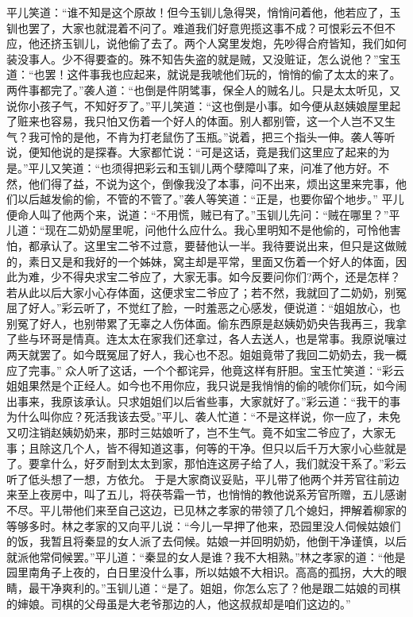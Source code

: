 \documentclass[12pt,oneside]{book}
\begin{document}
平儿笑道：“谁不知是这个原故！但今玉钏儿急得哭，悄悄问着他，他若应了，玉钏也罢了，大家也就混着不问了。难道我们好意兜揽这事不成？可恨彩云不但不应，他还挤玉钏儿，说他偷了去了。两个人窝里发炮，先吵得合府皆知，我们如何装没事人。少不得要查的。殊不知告失盗的就是贼，又没赃证，怎么说他？”宝玉道：“也罢！这件事我也应起来，就说是我唬他们玩的，悄悄的偷了太太的来了。两件事都完了。”袭人道：“也倒是件阴骘事，保全人的贼名儿。只是太太听见，又说你小孩子气，不知好歹了。”平儿笑道：“这也倒是小事。如今便从赵姨娘屋里起了赃来也容易，我只怕又伤着一个好人的体面。别人都别管，这一个人岂不又生气？我可怜的是他，不肯为打老鼠伤了玉瓶。”说着，把三个指头一伸。袭人等听说，便知他说的是探春。大家都忙说：“可是这话，竟是我们这里应了起来的为是。”平儿又笑道：“也须得把彩云和玉钏儿两个孽障叫了来，问准了他方好。不然，他们得了益，不说为这个，倒像我没了本事，问不出来，烦出这里来完事，他们以后越发偷的偷，不管的不管了。”袭人等笑道：“正是，也要你留个地步。”
平儿便命人叫了他两个来，说道：“不用慌，贼已有了。”玉钏儿先问：“贼在哪里？”平儿道：“现在二奶奶屋里呢，问他什么应什么。我心里明知不是他偷的，可怜他害怕，都承认了。这里宝二爷不过意，要替他认一半。我待要说出来，但只是这做贼的，素日又是和我好的一个姊妹，窝主却是平常，里面又伤着一个好人的体面，因此为难，少不得央求宝二爷应了，大家无事。如今反要问你们?两个，还是怎样？若从此以后大家小心存体面，这便求宝二爷应了；若不然，我就回了二奶奶，别冤屈了好人。”彩云听了，不觉红了脸，一时羞恶之心感发，便说道：“姐姐放心，也别冤了好人，也别带累了无辜之人伤体面。偷东西原是赵姨奶奶央告我再三，我拿了些与环哥是情真。连太太在家我们还拿过，各人去送人，也是常事。我原说嚷过两天就罢了。如今既冤屈了好人，我心也不忍。姐姐竟带了我回二奶奶去，我一概应了完事。”
众人听了这话，一个个都诧异，他竟这样有肝胆。宝玉忙笑道：“彩云姐姐果然是个正经人。如今也不用你应，我只说是我悄悄的偷的唬你们玩，如今闹出事来，我原该承认。只求姐姐们以后省些事，大家就好了。”彩云道：“我干的事为什么叫你应？死活我该去受。”平儿、袭人忙道：“不是这样说，你一应了，未免又叨注销赵姨奶奶来，那时三姑娘听了，岂不生气。竟不如宝二爷应了，大家无事；且除这几个人，皆不得知道这事，何等的干净。但只以后千万大家小心些就是了。要拿什么，好歹耐到太太到家，那怕连这房子给了人，我们就没干系了。”彩云听了低头想了一想，方依允。
于是大家商议妥贴，平儿带了他两个并芳官往前边来至上夜房中，叫了五儿，将茯苓霜一节，也悄悄的教他说系芳官所赠，五儿感谢不尽。平儿带他们来至自己这边，已见林之孝家的带领了几个媳妇，押解着柳家的等够多时。林之孝家的又向平儿说：“今儿一早押了他来，恐园里没人伺候姑娘们的饭，我暂且将秦显的女人派了去伺候。姑娘一并回明奶奶，他倒干净谨慎，以后就派他常伺候罢。”平儿道：“秦显的女人是谁？我不大相熟。”林之孝家的道：“他是园里南角子上夜的，白日里没什么事，所以姑娘不大相识。高高的孤拐，大大的眼睛，最干净爽利的。”玉钏儿道：“是了。姐姐，你怎么忘了？他是跟二姑娘的司棋的婶娘。司棋的父母虽是大老爷那边的人，他这叔叔却是咱们这边的。”
\end{document}
